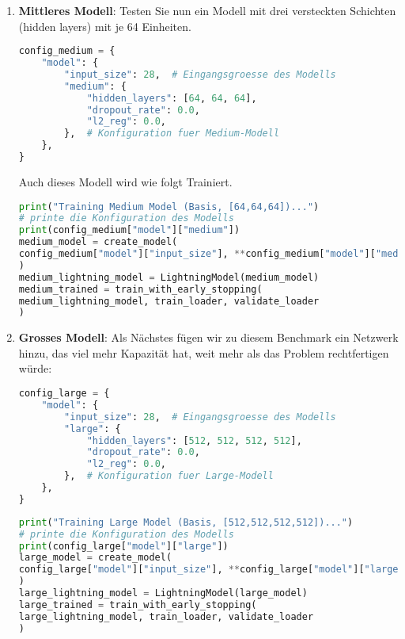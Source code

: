 \documentclass[11pt,a4paper,headinclude]{scrartcl}
\begin{document}
\begin{Aufgabe}
\begin{enumerate}
		
		
		\item \textbf{Mittleres Modell}: Testen Sie nun ein Modell mit drei versteckten Schichten (hidden layers) mit je 64 Einheiten.
		
		\begin{lstlisting}[language=Python]
config_medium = {
	"model": {
		"input_size": 28,  # Eingangsgroesse des Modells
		"medium": {
			"hidden_layers": [64, 64, 64],
			"dropout_rate": 0.0,
			"l2_reg": 0.0,
		},  # Konfiguration fuer Medium-Modell
	},
}
		\end{lstlisting}
		
		Auch dieses Modell wird wie folgt Trainiert.
		\begin{lstlisting}[language=Python]
print("Training Medium Model (Basis, [64,64,64])...")
# printe die Konfiguration des Modells
print(config_medium["model"]["medium"])
medium_model = create_model(
config_medium["model"]["input_size"], **config_medium["model"]["medium"]
)
medium_lightning_model = LightningModel(medium_model)
medium_trained = train_with_early_stopping(
medium_lightning_model, train_loader, validate_loader
)
		\end{lstlisting}
		
		
		\item \textbf{Grosses Modell}: Als Nächstes fügen wir zu diesem Benchmark ein Netzwerk hinzu, das viel mehr Kapazität hat, weit mehr als das Problem rechtfertigen würde:
		
		\begin{lstlisting}[language=Python]
config_large = {
	"model": {
		"input_size": 28,  # Eingangsgroesse des Modells
		"large": {
			"hidden_layers": [512, 512, 512, 512],
			"dropout_rate": 0.0,
			"l2_reg": 0.0,
		},  # Konfiguration fuer Large-Modell
	},
}
		\end{lstlisting}
		
		\begin{lstlisting}[language=Python]
print("Training Large Model (Basis, [512,512,512,512])...")
# printe die Konfiguration des Modells
print(config_large["model"]["large"])
large_model = create_model(
config_large["model"]["input_size"], **config_large["model"]["large"]
)
large_lightning_model = LightningModel(large_model)
large_trained = train_with_early_stopping(
large_lightning_model, train_loader, validate_loader
)
		\end{lstlisting}
		

\end{enumerate}
\end{Aufgabe}
\end{document}

